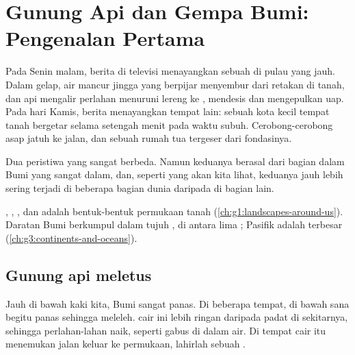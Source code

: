 \chapter{Gunung Api dan Gempa Bumi: Pengenalan Pertama}\label{ch:g4:volcanoes-earthquakes-first-look}

Pada Senin malam, berita di televisi menayangkan sebuah  di
pulau yang jauh. Dalam gelap, air mancur  jingga yang berpijar
menyembur dari retakan di tanah, dan  api mengalir perlahan
menuruni lereng ke , mendesis dan mengepulkan uap. Pada hari Kamis,
berita menayangkan tempat lain: sebuah kota kecil tempat tanah bergetar
selama setengah menit pada waktu subuh. Cerobong-cerobong asap jatuh ke
jalan, dan sebuah rumah tua tergeser dari fondasinya.

Dua peristiwa yang sangat berbeda. Namun keduanya berasal dari bagian dalam
Bumi yang sangat dalam, dan, seperti yang akan kita lihat, keduanya jauh
lebih sering terjadi di beberapa bagian dunia daripada di bagian lain.

\begin{recall}
, , , dan  adalah bentuk-bentuk permukaan tanah
(\cref{ch:g1:landscapes-around-us}). Daratan Bumi berkumpul dalam tujuh
, di antara lima ;  Pasifik adalah  terbesar
(\cref{ch:g3:continents-and-oceans}).
\end{recall}

\section{Gunung api meletus}

Jauh di bawah kaki kita, Bumi sangat panas. Di beberapa tempat,  di
bawah sana begitu panas sehingga meleleh.  cair ini lebih ringan
daripada  padat di sekitarnya, sehingga perlahan-lahan naik, seperti
gabus di dalam air. Di tempat  cair itu menemukan jalan keluar ke
permukaan, lahirlah sebuah .


